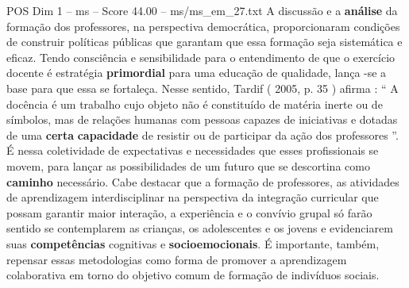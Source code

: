 \begin{textsample}{POS Dim 1 – ms – Score 44.00 – ms/ms\_em\_27.txt}
A discussão e a \textbf{análise} da formação dos professores, na perspectiva democrática, proporcionaram condições de construir políticas públicas que garantam que essa formação seja sistemática e eficaz.
Tendo consciência e sensibilidade para o entendimento de que o exercício docente é estratégia \textbf{primordial} para uma educação de qualidade, lança -se a base para que essa se fortaleça.
Nesse sentido, Tardif ( 2005, p. 35 ) afirma : “ A docência é um trabalho cujo objeto não é constituído de matéria inerte ou de símbolos, mas de relações humanas com pessoas capazes de iniciativas e dotadas de uma \textbf{certa} \textbf{capacidade} de resistir ou de participar da ação dos professores ”.
É nessa coletividade de expectativas e necessidades que esses profissionais se movem, para lançar as possibilidades de um futuro que se descortina como \textbf{caminho} necessário.
Cabe destacar que a formação de professores, as atividades de aprendizagem interdisciplinar na perspectiva da integração curricular que possam garantir maior interação, a experiência e o convívio grupal só farão sentido se contemplarem as crianças, os adolescentes e os jovens e evidenciarem suas \textbf{competências} cognitivas e \textbf{socioemocionais}.
É importante, também, repensar essas metodologias como forma de promover a aprendizagem colaborativa em torno do objetivo comum de formação de indivíduos sociais.

\end{textsample}
